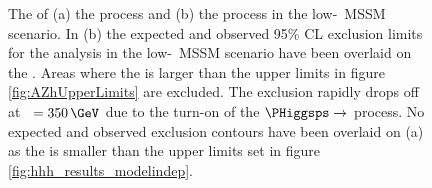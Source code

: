 \begin{figure}[h!]
\begin{center}
\caption[\xsbr of the \Htohhtobbtautau
process and the \AtoZhtolltautau process in the low-\tanb ~MSSM scenario. The
expected and observed 95\% CL exclusion limits for the \AtoZhtolltautau analysis
in the low \tanb~MSSM scenario have been overlaid.]{The \xsbr of (a) the \Htohhtobbtautau process and (b) the
\AtoZhtolltautau process in the low-\tanb~MSSM scenario. In (b) 
the expected and observed 95\% \ac{CL} exclusion limits for the \AtoZhtolltautau analysis in the low-\tanb~MSSM scenario
have been overlaid on the \xsbr. Areas where the 
\xsbr is larger than the upper limits in figure \ref{fig:AZhUpperLimits} are excluded. The exclusion rapidly drops
off at \mA~$ = 350\,\GeV$ due to the turn-on of the $\PHiggsps \rightarrow$ \ttbar process.
No expected and observed exclusion contours
have been overlaid on (a) as the 
\xsbr is smaller than the upper limits set in figure \ref{fig:hhh_results_modelindep}.}
\label{fig:HhhAndAZhlowtanb}
\end{center}
\end{figure}





